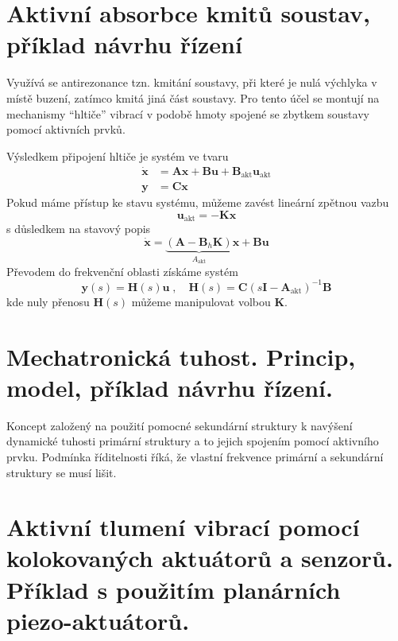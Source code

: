 \documentclass{article}
\begin{document}
	\section{Aktivní absorbce kmitů soustav, příklad návrhu řízení}
	
	Využívá se antirezonance tzn. kmitání soustavy, při které je nulá výchlyka v místě buzení, zatímco kmitá jiná část soustavy. Pro tento účel se montují na mechanismy ``hltiče'' vibrací v podobě hmoty spojené se zbytkem soustavy pomocí aktivních prvků.

	Výsledkem připojení hltiče je systém ve tvaru
	\begin{align}
		\bm{\dot{x}} &= \bm{A}\bm{x} + \bm{B}\bm{u} + \bm{B}_\text{akt} \bm{u}_\text{akt} \\
		\bm{y} &= \bm{C}\bm{x}
	\end{align}
	Pokud máme přístup ke stavu systému, můžeme zavést lineární zpětnou vazbu
	\begin{equation}
		\bm{u}_\text{akt} = -\bm{K}\bm{x}
	\end{equation}
	s důsledkem na stavový popis
	\begin{equation}
		\bm{\dot{x}} = \underbrace{(\bm{A}-\bm{B}_h\bm{K})}_{A_\text{akt}}\bm{x} + \bm{B}\bm{u}
	\end{equation}
	Převodem do frekvenční oblasti získáme systém
	\begin{equation}
	\bm{y}(s) = \bm{H}(s)\bm{u}
	\;,\quad 
	\bm{H}(s) = \bm{C}(s\bm{I}-\bm{A}_\text{akt})^{-1}\bm{B}
	\end{equation}
	kde nuly přenosu $\bm{H}(s)$ můžeme manipulovat volbou $\bm{K}$.

	\section{Mechatronická tuhost. Princip, model, příklad návrhu řízení.}

	Koncept založený na použití pomocné sekundární struktury k navýšení dynamické tuhosti primární struktury a to jejich spojením pomocí aktivního prvku. Podmínka říditelnosti říká, že vlastní frekvence primární a sekundární struktury se musí lišit.

	\pagebreak
	\section{Aktivní tlumení vibrací pomocí kolokovaných aktuátorů a senzorů. Příklad s použitím planárních piezo-aktuátorů.}

\end{document}
